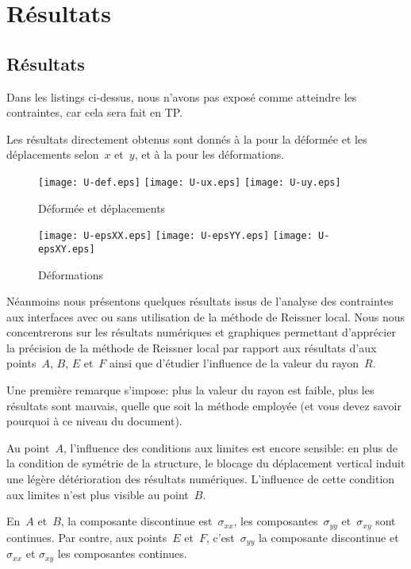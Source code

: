 \medskip
\ifVersionAvecExemplesSepares
  \section{Résultats}
\else
  \subsection{Résultats}
\fi


Dans les listings ci-dessus, nous n'avons pas exposé comme atteindre les contraintes, car cela sera fait en TP.

Les résultats directement obtenus sont donnés à la  pour la déformée et les déplacements selon~$x$ et~$y$,
et à la  pour les déformations.
\begin{figure}[h!]
  \texttt{[image: U-def.eps]} \hfill
  \texttt{[image: U-ux.eps]}\hfill
  \texttt{[image: U-uy.eps]}
  \caption{\label{Fig-poutU-disp} Déformée et déplacements}
\end{figure}
\begin{figure}[h!]
  \texttt{[image: U-epsXX.eps]} \hfill
  \texttt{[image: U-epsYY.eps]}\hfill
  \texttt{[image: U-epsXY.eps]}
  \caption{\label{Fig-poutU-eps} Déformations}
\end{figure}



\medskip
Néanmoins nous présentons quelques résultats issus de l'analyse des contraintes aux interfaces avec ou sans
utilisation de la méthode de Reissner local.
Nous nous concentrerons sur les résultats numériques et graphiques permettant d'apprécier la précision de la
méthode de Reissner local par rapport aux résultats d'\ansys aux points~$A$, $B$, $E$ et~$F$ ainsi que d'étudier
l'influence de la valeur du rayon~$R$.

\medskip
Une première remarque s'impose: plus la valeur du rayon est faible, plus les résultats sont mauvais, quelle que soit la
méthode employée (et vous devez savoir pourquoi à ce niveau du document).

\medskip
Au point~$A$, l'influence des conditions aux limites est encore sensible: en plus de la condition de symétrie de la structure,
le blocage du déplacement vertical induit une légère détérioration des résultats numériques. L'influence
de cette condition aux limites n'est plus visible au point~$B$.

\medskip
En~$A$ et~$B$, la composante discontinue est~$\sigma_{xx}$, les composantes~$\sigma_{yy}$ et~$\sigma_{xy}$ sont
continues. Par contre, aux points~$E$ et~$F$, c'est~$\sigma_{yy}$ la composante discontinue et~$\sigma_{xx}$ et
$\sigma_{xy}$ les composantes continues.

